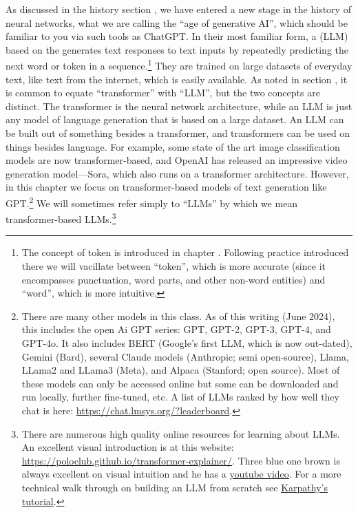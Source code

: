 As discussed in the history section , we have entered a new stage in the history of neural networks, what we are calling the ``age of generative AI'', which should be familiar to you via such tools as ChatGPT. In their most familiar form, a  (LLM) based on the  generates text responses to text inputs by repeatedly predicting the next word or token in a sequence.\footnote{The concept of token is introduced in chapter . Following practice introduced there we will vacillate between ``token'', which is more accurate (since it encompasses punctuation, word parts, and other non-word entities) and ``word'', which is more intuitive.} They are trained on large datasets of everyday text, like text from the internet, which is easily available. As noted in section , it is common to equate ``transformer'' with ``LLM'', but the two concepts are distinct. The transformer is the neural network architecture, while an LLM is just any model of language generation that is based on a large dataset. An LLM can be built out of something besides a transformer, and transformers can be used on things besides language. For example, some state of the art image classification models are now transformer-based, and OpenAI has released an impressive video generation model---Sora, which also runs on a transformer architecture. However, in this chapter we focus on transformer-based models of text generation like GPT.\footnote{There are many other models in this class. As of this writing (June 2024), this includes the open Ai GPT series: GPT, GPT-2, GPT-3, GPT-4, and GPT-4o. It also includes BERT (Google’s first LLM, which is now out-dated), Gemini (Bard), several Claude models (Anthropic;  semi open-source), Llama, LLama2 and LLama3 (Meta), and Alpaca (Stanford; open source). Most of these models can only be accessed online but some can be downloaded and run locally, further fine-tuned, etc. A list of LLMs ranked by how well they chat is here: \url{https://chat.lmsys.org/?leaderboard}.} We will sometimes refer simply to ``LLMs'' by which we mean transformer-based LLMs.\footnote{There are numerous high quality online resources for learning about LLMs. An excellent visual introduction is at this website: \url{https://poloclub.github.io/transformer-explainer/}. Three blue one brown is always excellent on visual intuition and he has a \href{https://www.youtube.com/watch?v=wjZofJX0v4M&list=PLZHQObOWTQDNU6R1_67000Dx_ZCJB-3pi}{\underline{youtube video}}. For a more technical walk through on building an LLM from scratch see \href{https://www.youtube.com/watch?v=kCc8FmEb1nY}{\underline{Karpathy's tutorial}}.}

